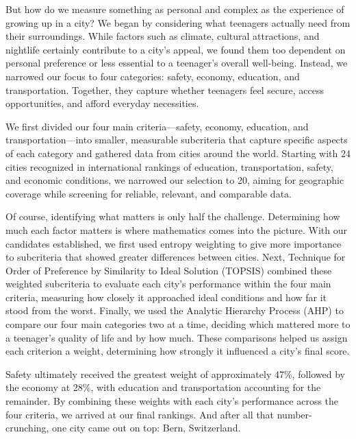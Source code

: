 \documentclass[11pt,letterpaper]{article}
\begin{document}
\par\indent But how do we measure something as personal and complex as the experience of growing up in a city? We began by considering what teenagers actually need from their surroundings. While factors such as climate, cultural attractions, and nightlife certainly contribute to a city's appeal, we found them too dependent on personal preference or less essential to a teenager's overall well-being. Instead, we narrowed our focus to four categories: safety, economy, education, and transportation. Together, they capture whether teenagers feel secure, access opportunities, and afford everyday necessities.

\par\indent We first divided our four main criteria---safety, economy, education, and transportation---into smaller, measurable subcriteria that capture specific aspects of each category and gathered data from cities around the world. Starting with 24 cities recognized in international rankings of education, transportation, safety, and economic conditions, we narrowed our selection to 20, aiming for geographic coverage while screening for reliable, relevant, and comparable data.

\par\indent Of course, identifying what matters is only half the challenge. Determining how much each factor matters is where mathematics comes into the picture. With our candidates established, we first used entropy weighting to give more importance to subcriteria that showed greater differences between cities. Next, Technique for Order of Preference by Similarity to Ideal Solution (TOPSIS) combined these weighted subcriteria to evaluate each city's performance within the four main criteria, measuring how closely it approached ideal conditions and how far it stood from the worst. Finally, we used the Analytic Hierarchy Process (AHP) to compare our four main categories two at a time, deciding which mattered more to a teenager's quality of life and by how much. These comparisons helped us assign each criterion a weight, determining how strongly it influenced a city's final score.

\par\indent Safety ultimately received the greatest weight of approximately 47\%, followed by the economy at 28\%, with education and transportation accounting for the remainder. By combining these weights with each city's performance across the four criteria, we arrived at our final rankings. And after all that number-crunching, one city came out on top: Bern, Switzerland.
\end{document}
